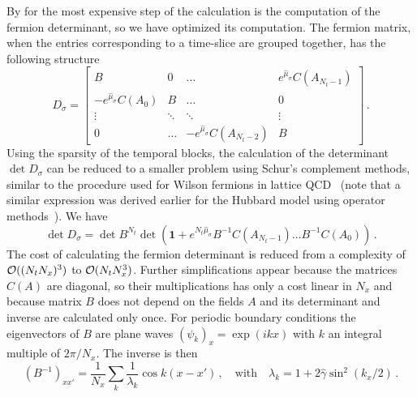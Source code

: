\documentclass[aps,eqsecnum,amsmath,onecolumn,groupedaddress,superscriptaddress,notitlepage,nofootinbib]{revtex4-1}
\newcommand{\beq}{\begin{equation}}
\newcommand{\eeq}{\end{equation}}
\newcommand{\eq}[1]{Eq.~(\ref{#1})}
\begin{document}
By for the most expensive step of the calculation is the computation of the fermion determinant, so we have optimized its computation. 
The fermion matrix, when the entries corresponding to a time-slice are grouped together, has
the following structure
\beq
D_{\sigma} = 
\begin{bmatrix}
B & 0 & \dots & e^{\hat\mu_\sigma} C(A_{N_t -1})\\
-e^{\hat\mu_\sigma} C(A_{0}) & B & \dots & 0\\
\vdots & \ddots & \ddots & \vdots\\
0 & \dots & -e^{\hat\mu_\sigma} C(A_{N_t -2}) & B
\end{bmatrix} \,.
\label{eq:block}
\eeq 
Using the sparsity of the temporal blocks, the calculation of the determinant $\det D_\sigma$
can be reduced to a smaller problem using Schur's complement methods, similar to the procedure
used for Wilson fermions in lattice QCD~\cite{Alexandru:2010yb} (note that a similar expression
was derived earlier for the Hubbard model using operator 
methods~\cite{Blankenbecler:1981jt,White:1989zz}). We have
\beq
\det D_{\sigma} = \det B^{N_t} \det(\mathbf{1} + e^{N_t\hat\mu_\sigma}
B^{-1}C(A_{N_t-1})...B^{-1}C(A_{0})) \,.
\label{eq:hubb}
\eeq 
The cost of calculating the fermion determinant is reduced from a complexity of ${\cal O}((N_t N_x)^3)$ to ${\cal O}(N_t N_x^3)$. Further simplifications appear because the matrices $C(A)$ are
diagonal, so their multiplications has only a cost linear in $N_x$ and because matrix $B$ does
not depend on the fields $A$ and its determinant and inverse are calculated only once. For periodic
boundary conditions the eigenvectors of $B$ are plane waves 
$(\psi_k)_x=\exp(i k x)$ with $k$ an integral multiple of $2\pi/N_x$. The inverse
is then
\beq
(B^{-1})_{xx'} = \frac1{N_x}\sum_{k} \frac1{\lambda_k} \cos{k(x-x')} \,, \quad\text{with}\quad
\lambda_k = 1 + 2\hat\gamma \sin^2 (k_x/2) \,.
\eeq
\end{document}

